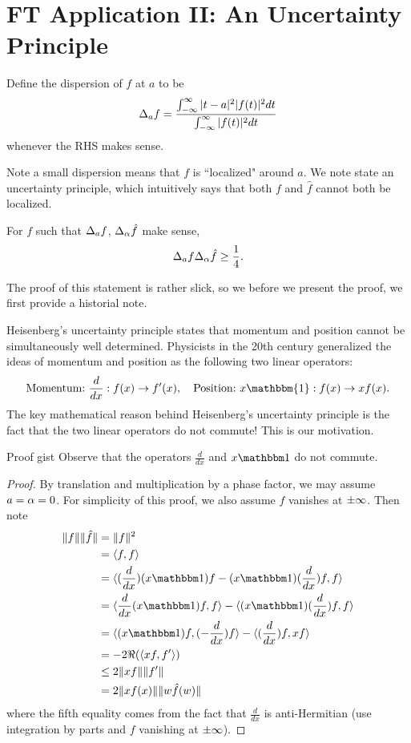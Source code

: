 \section{FT Application II: An Uncertainty Principle}
\begin{dfn}
    Define the dispersion of $f$ at $a$ to be
    \[
        \Delta_a f = \frac{\int_{-\infty}^\infty |t-a|^2|f(t)|^2dt}{
        \int_{-\infty}^\infty |f(t)|^2dt}
    \]
    whenever the RHS makes sense.
\end{dfn}
Note a small dispersion means that $f$ is ``localized" around $a$. We note state an uncertainty principle, which intuitively says that both $f$ and $\hat{f}$ cannot both be localized.
\begin{thm}
    For $f$ such that $\Delta_a f$, $\Delta_\alpha \hat{f}$ make sense,
    \[
        \Delta_a f \Delta_\alpha \hat{f} \geq \frac{1}{4}.
    \]
\end{thm}
The proof of this statement is rather slick, so we before we present the proof, we first provide a historial note.

Heisenberg's uncertainty principle states that momentum and position cannot be simultaneously well determined. Physicists in the 20th century generalized the ideas of momentum and position as the following two linear operators:
\[
    \text{Momentum:} \ \frac{d}{dx}: f(x) \rightarrow f'(x), \quad \text{Position:} \ x\mathbbm{1}: f(x) \rightarrow xf(x).
\]
The key mathematical reason behind Heisenberg's uncertainty principle is the fact that the two linear operators do not commute! This is our motivation.
\begin{details}{Proof gist}
    Observe that the operators $ \frac{d}{dx}$ and $x \mathbbm 1$ do not commute.
\end{details}
\begin{proof}
    By translation and multiplication by a phase factor, we may assume $a = \alpha = 0$. For simplicity of this proof, we also assume $f$ vanishes at $\pm \infty$. Then note
    \[
        \begin{split}
            \|f\|\|\hat{f}\| &= \|f\|^2\\
                             &= \langle f, f\rangle\\
                             &= \langle ( \frac{d}{dx})(x\mathbbm 1)f -
                             (x \mathbbm 1)( \frac{d}{dx}) f, f \rangle\\
                             &= \langle \frac{d}{dx}(x \mathbbm 1)f, f\rangle
                             -
                             \langle (x \mathbbm 1)( \frac{d}{dx}) f, f\rangle\\
                             &= \langle (x \mathbbm 1)f, (- \frac{d}{dx})f\rangle
                             -
                             \langle ( \frac{d}{dx}) f, xf\rangle\\
                             &= -2\Re( \langle xf, f' \rangle)\\
                             &\leq 2\|xf\|\|f'\|\\
                             &= 2\|xf(x)\|\|w\hat{f}(w)\|
        \end{split}
    \]
    where the fifth equality comes from the fact that $ \frac{d}{dx}$ is anti-Hermitian (use integration by parts and $f$ vanishing at $\pm \infty$).
\end{proof}

